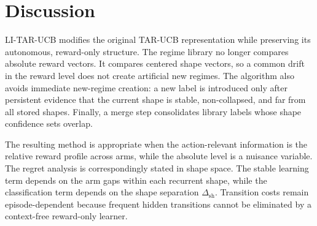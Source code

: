 \documentclass[11pt]{article}
\begin{document}
\section{Discussion}
\label{sec:discussion}

LI-TAR-UCB modifies the original TAR-UCB representation while preserving its autonomous, reward-only structure. The regime library no longer compares absolute reward vectors. It compares centered shape vectors, so a common drift in the reward level does not create artificial new regimes. The algorithm also avoids immediate new-regime creation: a new label is introduced only after persistent evidence that the current shape is stable, non-collapsed, and far from all stored shapes. Finally, a merge step consolidates library labels whose shape confidence sets overlap.

The resulting method is appropriate when the action-relevant information is the relative reward profile across arms, while the absolute level is a nuisance variable. The regret analysis is correspondingly stated in shape space. The stable learning term depends on the arm gaps within each recurrent shape, while the classification term depends on the shape separation $\Delta_{\mathrm{sh}}$. Transition costs remain episode-dependent because frequent hidden transitions cannot be eliminated by a context-free reward-only learner.
\end{document}
